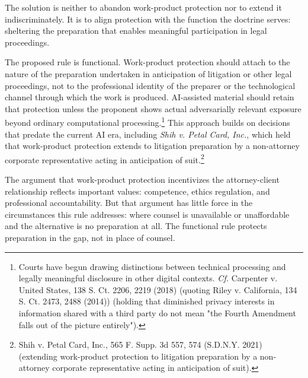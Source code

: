 \documentclass[
  12pt,
]{article}
\begin{document}
The solution is neither to abandon work-product protection nor to
extend it indiscriminately. It is to align protection with the function
the doctrine serves: sheltering the preparation that enables meaningful
participation in legal proceedings.

The proposed rule is functional. Work-product protection should attach
to the nature of the preparation undertaken in anticipation of
litigation or other legal proceedings, not to the professional identity
of the preparer or the technological channel through which the work is
produced. AI-assisted material should retain that protection unless the
proponent shows actual adversarially relevant exposure beyond ordinary
computational processing.\footnote{Courts have begun drawing distinctions between
  technical processing and legally meaningful disclosure in other
  digital contexts. \emph{Cf.} Carpenter v. United States, 138 S. Ct.
  2206, 2219 (2018) (quoting Riley v. California, 134 S. Ct. 2473, 2488
  (2014)) (holding that diminished privacy interests in information
  shared with a third party do not mean "the Fourth Amendment falls out
  of the picture entirely").} This approach builds on decisions that
predate the current AI era, including \emph{Shih v. Petal Card, Inc.},
which held that work-product protection extends to litigation
preparation by a non-attorney corporate representative acting in
anticipation of suit.\footnote{Shih v. Petal Card, Inc., 565 F. Supp. 3d
  557, 574 (S.D.N.Y. 2021) (extending work-product protection to
  litigation preparation by a non-attorney corporate representative
  acting in anticipation of suit).}

The argument that work-product protection incentivizes the
attorney-client relationship reflects important values: competence,
ethics regulation, and professional accountability. But that argument
has little force in the circumstances this rule addresses: where counsel
is unavailable or unaffordable and the alternative is no preparation at
all. The functional rule protects preparation in the gap, not in place
of counsel.
\end{document}
